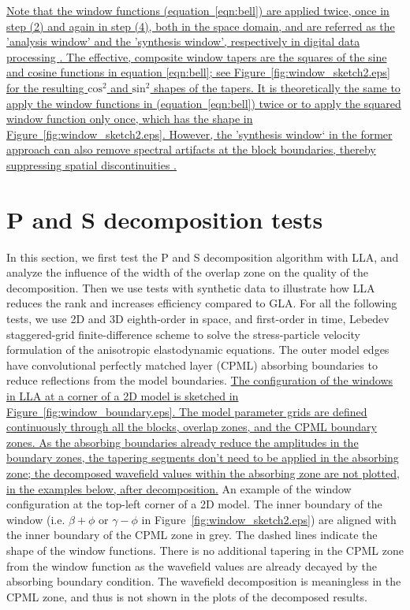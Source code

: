 \documentclass[manuscript,ulem,graphix,revised]{geophysics}
\begin{document}
\marginnote{[2, 17]}\uline{Note that the window functions (equation~\ref{eqn:bell}) are applied twice, once in step (2) and again in step (4), both in the space domain, and are referred as the 'analysis window' and the 'synthesis window', respectively in digital data processing \mbox{\citep{julius11}}. The effective, composite window tapers are the squares of the sine and cosine functions in equation \ref{eqn:bell}; see Figure~\ref{fig:window_sketch2.eps} for the resulting $\mathrm{cos^2}$ and $\mathrm{sin^2}$ shapes of the tapers. It is theoretically the same to apply the window functions in (equation~\ref{eqn:bell}) twice or to apply the squared window function only once, which has the shape in Figure~\ref{fig:window_sketch2.eps}. However, the 'synthesis window` in the former approach can also remove spectral artifacts at the block boundaries, thereby suppressing spatial discontinuities \mbox{\citep{julius11}}. }

\section{P and S decomposition tests}
\indent\indent
In this section, we first test the P and S decomposition algorithm with LLA, and analyze the influence of the width of the overlap zone on the quality of the decomposition. Then we use tests with synthetic data to illustrate how LLA reduces the rank and increases efficiency compared to GLA.
For all the following tests, we use 2D and 3D eighth-order in space, and first-order in time, Lebedev staggered-grid finite-difference scheme \citep{vadim10} to solve the stress-particle velocity formulation of the anisotropic elastodynamic equations. The outer model edges have convolutional perfectly matched layer (CPML) absorbing boundaries \citep{komatitsch07} to reduce reflections from the model boundaries. 
\marginnote{[17]}\uline{The configuration of the windows in LLA at a corner of a 2D model is sketched in Figure~\ref{fig:window_boundary.eps}. The model parameter grids are defined continuously through all the blocks, overlap zones, and the CPML boundary zones. As the absorbing boundaries already reduce the amplitudes in the boundary zones, the tapering segments don't need to be applied in the absorbing zone; the decomposed wavefield values within the absorbing zone are not plotted, in the examples below, after decomposition.}
 {
An example of the window configuration at the top-left corner of a 2D model. 
The inner boundary of the window (i.e. $\beta+\phi$ or $\gamma-\phi$ in Figure~\ref{fig:window_sketch2.eps}) are aligned with the inner boundary of the CPML zone in grey.
The dashed lines indicate the shape of the window functions. There is no additional tapering in the CPML zone from the window function as the wavefield values are already decayed by the absorbing boundary condition. The wavefield decomposition is meaningless in the CPML zone, and thus is not shown in the plots of the decomposed results.
}
\end{document}
